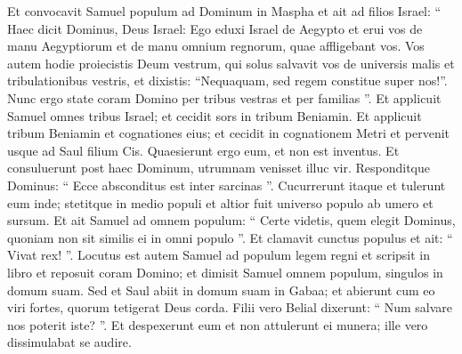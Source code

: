 \begin{biblechapter}
\begin{biblechapter}
\begin{biblechapter}
\begin{biblechapter}
\begin{biblechapter}
\begin{biblechapter}
\begin{biblechapter}
\begin{biblechapter}
\begin{biblechapter}
\begin{biblechapter}
 \verse Et convocavit Samuel populum ad Dominum in Maspha 
\verse et ait ad filios Israel: “ Haec dicit Dominus, Deus Israel: Ego eduxi Israel de Aegypto et erui vos de manu Aegyptiorum et de manu omnium regnorum, quae affligebant vos. 
\verse Vos autem hodie proiecistis Deum vestrum, qui solus salvavit vos de universis malis et tribulationibus vestris, et dixistis: “Nequaquam, sed regem constitue super nos!”. Nunc ergo state coram Domino per tribus vestras et per familias ”.
 \verse Et applicuit Samuel omnes tribus Israel; et cecidit sors in tribum Beniamin. 
\verse Et applicuit tribum Beniamin et cognationes eius; et cecidit in cognationem Metri et pervenit usque ad Saul filium Cis. Quaesierunt ergo eum, et non est inventus. 
\verse Et consuluerunt post haec Dominum, utrumnam venisset illuc vir. Responditque Dominus: “ Ecce absconditus est inter sarcinas ”. 
\verse Cucurrerunt itaque et tulerunt eum inde; stetitque in medio populi et altior fuit universo populo ab umero et sursum. 
\verse Et ait Samuel ad omnem populum:
 “ Certe videtis, quem elegit Dominus, quoniam non sit similis ei in omni populo ”. Et clamavit cunctus populus et ait: “ Vivat rex! ”.
 \verse Locutus est autem Samuel ad populum legem regni et scripsit in libro et reposuit coram Domino; et dimisit Samuel omnem populum, singulos in domum suam.
 \verse Sed et Saul abiit in domum suam in Gabaa; et abierunt cum eo viri fortes, quorum tetigerat Deus corda. 
\verse Filii vero Belial dixerunt: “ Num salvare nos poterit iste? ”. Et despexerunt eum et non attulerunt ei munera; ille vero dissimulabat se audire.
 

\end{biblechapter}
\end{biblechapter}
\end{biblechapter}
\end{biblechapter}
\end{biblechapter}
\end{biblechapter}
\end{biblechapter}
\end{biblechapter}
\end{biblechapter}
\end{biblechapter}
